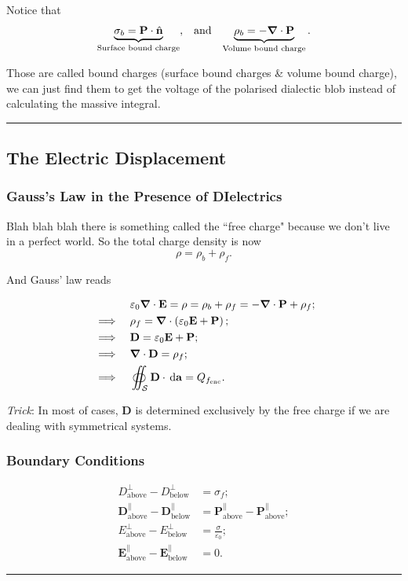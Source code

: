 \documentclass[12pt,english]{article}
\newcommand{\dmr}[1]{\, \mathrm{d}#1} %
\numberwithin{equation}{subsection}
\let\oldhat\hat
\renewcommand{\vec}[1]{\mathbf{#1}}
\renewcommand{\hat}[1]{\oldhat{\mathbf{#1}}}
\begin{document}
Notice that 
\begin{align*}
    \underbrace{\sigma_{b} = \vec{P} \cdot \hat{n}}_{\text{Surface bound charge}}, &&\text{and}&& \underbrace{\rho_b = -\grad \cdot \vec{P}}_{\text{Volume bound charge}}.
\end{align*}

Those are called bound charges (surface bound charges \& volume bound charge), we can just find them to get the voltage of the polarised dialectic blob instead of calculating the massive integral.
\par\noindent\rule{\textwidth}{0.4pt}
\subsection{The Electric Displacement}
\subsubsection{Gauss's Law in the Presence of DIelectrics}
Blah blah blah there is something called the ``free charge" because we don't live in a perfect world. So the total charge density is now
\[
    \rho = \rho_b + \rho_f.
\]

And Gauss' law reads

\begin{align}
     && &\varepsilon_0 \grad \cdot \vec{E} = \rho = \rho_b + \rho_f = -\grad\cdot\vec{P} + \rho_f;\nonumber \\
    &\implies& &\rho_f = \grad\cdot\left(\varepsilon_0 \vec{E} + \vec{P}\right);\nonumber \\
    &\implies& &\vec{D} = \varepsilon_0 \vec{E} + \vec{P};\\
    &\implies& &\grad \cdot \vec{D} = \rho_f;\\
    &\implies& &\oiint_{\mathcal{S}} \vec{D} \cdot \dmr{\vec{a}} = Q_{f_{\text{enc}}}.
\end{align}

\textit{Trick}: In most of cases, $\vec{D}$ is determined exclusively by the free charge if we are dealing with symmetrical systems.
\subsubsection{Boundary Conditions}
\begin{align}
    D^{\bot}_{\text{above}}-D^{\bot}_{\text{below}} &= \sigma_f;\\
    \vec{D}^{\parallel}_{\text{above}}-\vec{D}^{\parallel}_{\text{below}} &= \vec{P}^{\parallel}_{\text{above}}-\vec{P}^{\parallel}_{\text{above}};\\
    E^{\bot}_{\text{above}}-E^{\bot}_{\text{below}} &= \frac{\sigma}{\varepsilon_0};\\
    \vec{E}^{\parallel}_{\text{above}}-\vec{E}^{\parallel}_{\text{below}} &=0.
\end{align}
\par\noindent\rule{\textwidth}{0.4pt}
\end{document}
